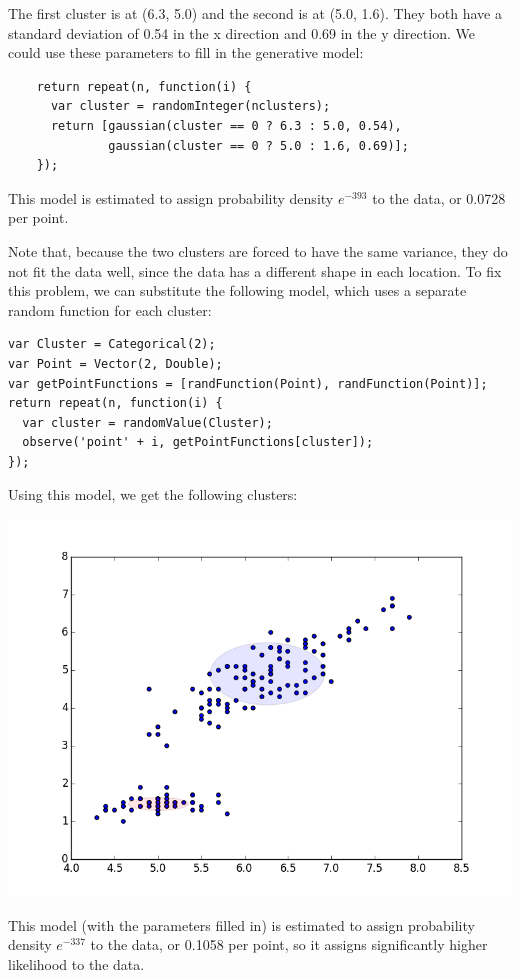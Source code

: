 \documentclass{article}
\begin{document}
  The first cluster is at (6.3, 5.0) and the second is at (5.0, 1.6).  They both
  have a standard deviation of 0.54 in the x direction and 0.69 in the y direction.
  We could use these parameters to fill in the generative model:
  \begin{verbatim}
    return repeat(n, function(i) {
      var cluster = randomInteger(nclusters);
      return [gaussian(cluster == 0 ? 6.3 : 5.0, 0.54),
              gaussian(cluster == 0 ? 5.0 : 1.6, 0.69)];
    });
  \end{verbatim}
  This model is estimated to assign probability density $e^{-393}$ to the data, or 0.0728 per point.

  Note that, because the two clusters are forced to have the same variance, they do not fit the data well,
  since the data has a different shape in each location.  To fix this problem, we can substitute the following
  model, which uses a separate random function for each cluster:
  \begin{verbatim}
var Cluster = Categorical(2);
var Point = Vector(2, Double);
var getPointFunctions = [randFunction(Point), randFunction(Point)];
return repeat(n, function(i) {
  var cluster = randomValue(Cluster);
  observe('point' + i, getPointFunctions[cluster]);
});
\end{verbatim}
  Using this model, we get the following clusters:
  \begin{center}
    \includegraphics[scale=0.5]{../plots/irisclusters_indep.png}
  \end{center}
  This model (with the parameters filled in) is estimated to assign probability density $e^{-337}$ to the data, or 0.1058 per point, so it assigns significantly higher likelihood to the data.
\end{document}
